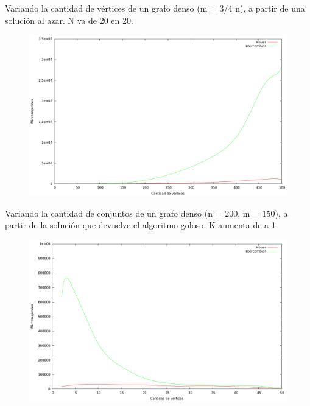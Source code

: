 Variando la cantidad de vértices de un grafo denso (m = 3/4 n), a partir de una
solución al azar. N va de 20 en 20.
\vspace*{0.5cm}

\begin{figure}[h]
  \begin{center}
    \includegraphics[scale=0.35]{imagenes/local-random-n-tiempo.png}
  \end{center}
\end{figure}

\vspace*{0.5cm}

Variando la cantidad de conjuntos de un grafo denso (n = 200, m = 150), a partir
de la solución que devuelve el algoritmo goloso. K aumenta de a 1.
\vspace*{0.5cm}

\begin{figure}[h]
  \begin{center}
    \includegraphics[scale=0.35]{imagenes/local-goloso-k-tiempo.png}
  \end{center}
\end{figure}


